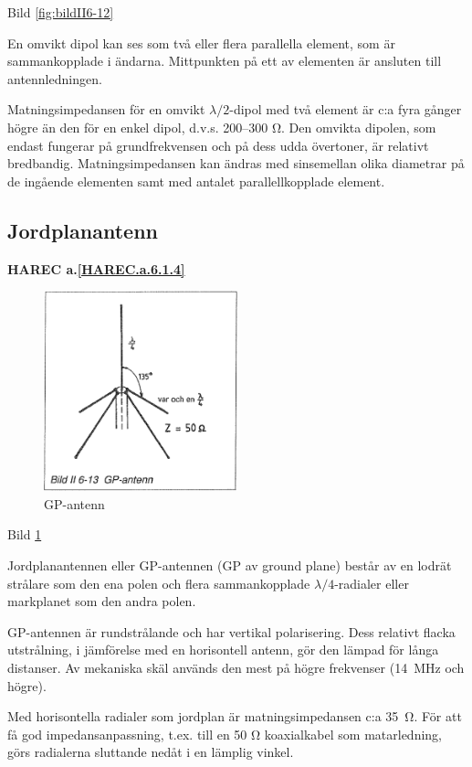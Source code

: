 Bild \ref{fig:bildII6-12}

En omvikt dipol kan ses som två eller flera parallella element, som är
sammankopplade i ändarna. Mittpunkten på ett av elementen är ansluten
till antennledningen.

Matningsimpedansen för en omvikt \(\lambda/2\)-dipol med två element är
c:a fyra gånger högre än den för en enkel dipol, d.v.s. 200--300
Ω. Den omvikta dipolen, som endast fungerar på grundfrekvensen och på
dess udda övertoner, är relativt bredbandig. Matningsimpedansen kan
ändras med sinsemellan olika diametrar på de ingående elementen samt
med antalet parallellkopplade element.

\subsection{Jordplanantenn}
\textbf{
HAREC a.\ref{HAREC.a.6.1.4}\label{myHAREC.a.6.1.4}
}

\begin{figure}
  \includegraphics[width=0.5\textwidth]{images/bild_2_6-13}
  \caption{GP-antenn}
  \label{fig:bildII6-13}
\end{figure}

Bild \ref{fig:bildII6-13}

Jordplanantennen eller GP-antennen (GP av ground plane) består av en
lodrät strålare som den ena polen och flera sammankopplade
\(\lambda/4\)-radialer eller markplanet som den andra polen.

GP-antennen är rundstrålande och har vertikal polarisering. Dess
relativt flacka utstrålning, i jämförelse med en horisontell antenn,
gör den lämpad för långa distanser.  Av mekaniska skäl används den
mest på högre frekvenser (14~MHz och högre).

Med horisontella radialer som jordplan är matningsimpedansen c:a 35~Ω.
För att få god impedansanpassning, t.ex. till en 50 Ω koaxialkabel
som matarledning, görs radialerna sluttande nedåt i en lämplig vinkel.

